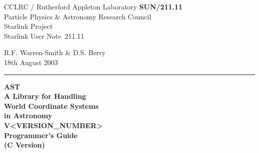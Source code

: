 \documentclass[twoside,11pt]{article}
\newcommand{\stardoccategory}  {Starlink User Note}
\newcommand{\stardocinitials}  {SUN}
\newcommand{\stardocnumber}    {211.11}
\newcommand{\stardocnumber}    {210.11}
\newcommand{\stardocauthors}   {R.F. Warren-Smith \& D.S. Berry}
\newcommand{\stardocdate}      {18th August 2003}
\newcommand{\stardoctitle}     {AST\\
                                A Library for Handling\\
                                World Coordinate Systems\\
                                in Astronomy}
\newcommand{\stardocversion}   {V<VERSION_NUMBER>}
\newcommand{\stardocmanual}    {Programmer's Guide\\(C Version)}
\newcommand{\stardocmanual}    {Programmer's Guide\\(Fortran Version)}
\newcommand{\stardocname}{\stardocinitials /\stardocnumber}
\newenvironment{latexonly}{}{}
\begin{document}
\thispagestyle{empty}

\begin{latexonly}
   CCLRC / {\sc Rutherford Appleton Laboratory} \hfill {\bf \stardocname}\\
   {\large Particle Physics \& Astronomy Research Council}\\
   {\large Starlink Project\\}
   {\large \stardoccategory\ \stardocnumber}
   \begin{flushright}
   \stardocauthors\\
   \stardocdate
   \end{flushright}
   \vspace{-4mm}
   \rule{\textwidth}{0.5mm}
   \vspace{-7mm}
   \begin{center}
   {\Huge\bf  \stardoctitle \\ [2.0ex]}
   {\LARGE\bf \stardocversion \\ [1.0ex]}
   {\Huge\bf  \stardocmanual}
   \end{center}


\end{latexonly}
\end{document}
